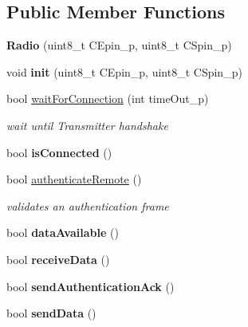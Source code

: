 \subsection*{Public Member Functions}
\begin{DoxyCompactItemize}
\item 
\mbox{\label{class_radio_a0775d3e885563f797abf893bd7dab722}} 
{\bfseries Radio} (uint8\+\_\+t C\+Epin\+\_\+p, uint8\+\_\+t C\+Spin\+\_\+p)
\item 
\mbox{\label{class_radio_a0824b3e73e1285a98b818a40e30eb784}} 
void {\bfseries init} (uint8\+\_\+t C\+Epin\+\_\+p, uint8\+\_\+t C\+Spin\+\_\+p)
\item 
bool \hyperlink{class_radio_acb313b8c4ccfbe9eed993d566e563f89}{wait\+For\+Connection} (int time\+Out\+\_\+p)
\begin{DoxyCompactList}\small\item\em wait until Transmitter handshake \end{DoxyCompactList}\item 
\mbox{\label{class_radio_a531aebd77214bc665027819db617a81d}} 
bool {\bfseries is\+Connected} ()
\item 
bool \hyperlink{class_radio_a50a86b8fbc5cd906c721d54406f98b9b}{authenticate\+Remote} ()
\begin{DoxyCompactList}\small\item\em validates an authentication frame \end{DoxyCompactList}\item 
\mbox{\label{class_radio_a85f5d3b2851f7787337c410f8608a45a}} 
bool {\bfseries data\+Available} ()
\item 
\mbox{\label{class_radio_af5f2ff2feaa025d251f6ec3682fb6477}} 
bool {\bfseries receive\+Data} ()
\item 
\mbox{\label{class_radio_a470a9f109780600f2e3ff815ff85f2f5}} 
bool {\bfseries send\+Authentication\+Ack} ()
\item 
\mbox{\label{class_radio_a666fdbfbf97b5cdd91e8a07fa9cd3fed}} 
bool {\bfseries send\+Data} ()
\item 
\mbox{\label{class_radio_aaee6ea0110396a7d2d500dcd18d3b80a}} 

\end{DoxyCompactItemize}
